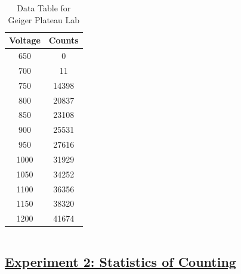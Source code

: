 \documentclass[twocolumn]{article}
\begin{document}
\begin{table}[h!]
  \centering
  \caption{Data Table for Geiger Plateau Lab}
  \begin{tabular}{|c|c|}
    \hline
    Voltage & Counts \\
    \hline
    650 & 0 \\
    \hline
    700 & 11 \\
    \hline
    750 & 14398 \\
    \hline
    800 & 20837 \\
    \hline
    850 & 23108 \\
    \hline
    900 & 25531 \\
    \hline
    950 & 27616 \\
    \hline
    1000 & 31929 \\
    \hline
    1050 & 34252 \\
    \hline
    1100 & 36356 \\
    \hline
    1150 & 38320 \\
    \hline
    1200 & 41674 \\
    \hline
  \end{tabular}
\end{table}








$$$$




\begin{center}\section*{\underline{Experiment 2: Statistics of Counting}}\end{center}
\end{document}
